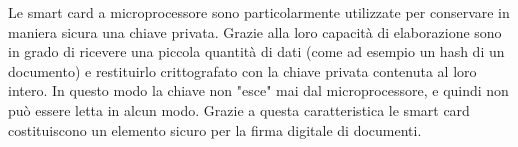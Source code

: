 Le smart card a microprocessore sono particolarmente utilizzate per conservare in maniera sicura una chiave privata. Grazie alla loro capacità di elaborazione sono in grado di ricevere una piccola quantità di dati (come ad esempio un hash di un documento) e restituirlo crittografato con la chiave privata contenuta al loro intero. In questo modo la chiave non "esce" mai dal microprocessore, e quindi non può essere letta in alcun modo. Grazie a questa caratteristica le smart card costituiscono un elemento sicuro per la firma digitale di documenti.
\cite{wiki_sc}




    
    
